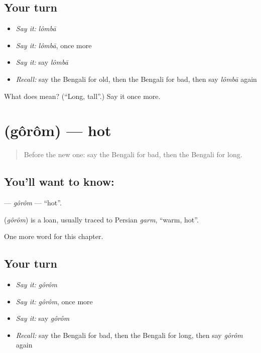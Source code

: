 \subsection*{Your turn}
\begin{itemize}
\raggedright
  \item \emph{Say it:} \emph{lômbā}
  \item \emph{Say it:} \emph{lômbā}, once more
  \item \emph{Say it:} say \emph{lômbā}
  \item \emph{Recall:} say the Bengali for old, then the Bengali for bad, then say \emph{lômbā} again
\end{itemize}

\begin{tcolorbox}[breakable,colback=teal!4,colframe=teal!35!black,title={Before you move on}]
What does  mean? (\textquotedblleft{}Long, tall\textquotedblright{}.) Say it once more.
\end{tcolorbox}
\section[\texorpdfstring{\bn{গরম} (gôrôm)}{গরম (gôrôm)}]{ (gôrôm) — hot}

\label{lesson:BN-C73-gorom}



\begin{quote}
Before the new one: say the Bengali for bad, then the Bengali for long.
\end{quote}

\subsection*{You'll want to know: }
\textbf{} — \emph{gôrôm} — \textquotedblleft{}hot\textquotedblright{}.

\begin{cousinweb}
\textbf{} (\emph{gôrôm}) is a loan, usually traced to Persian \emph{garm}, \textquotedblleft{}warm, hot\textquotedblright{}.
\end{cousinweb}

\begin{grammarlens}[title={What you've built}]
One more word for this chapter.
\end{grammarlens}

\subsection*{Your turn}
\begin{itemize}
\raggedright
  \item \emph{Say it:} \emph{gôrôm}
  \item \emph{Say it:} \emph{gôrôm}, once more
  \item \emph{Say it:} say \emph{gôrôm}
  \item \emph{Recall:} say the Bengali for bad, then the Bengali for long, then say \emph{gôrôm} again
\end{itemize}

